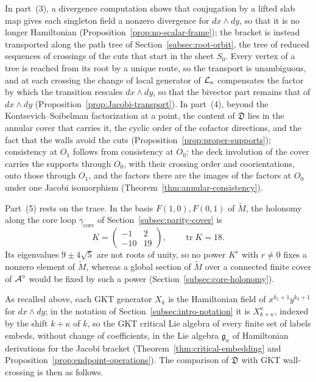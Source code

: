 In part~(3), a divergence computation shows that conjugation by a lifted
slab map gives each singleton field a nonzero divergence for $dx\wedge dy$,
so that it is no longer Hamiltonian
(Proposition~\ref{prop:no-scalar-frame}); the bracket is instead
transported along the path tree of Section~\ref{subsec:root-orbit}, the tree of reduced sequences of crossings
of the cuts that start in the sheet $S_0$.  Every vertex of a
tree is reached from its root by a unique route, so the transport is
unambiguous, and at each crossing the change of local generator of $\mathcal L_\kappa$
compensates the factor by which the transition rescales $dx\wedge dy$, so
that the bivector part remains that of $dx\wedge dy$
(Proposition~\ref{prop:Jacobi-transport}).  In part~(4), beyond the
Kontsevich--Soibelman factorization at a point, the content of $\mathfrak D$
lies in the annular cover that carries it, the cyclic order of the cofactor
directions, and the fact that the walls avoid the cuts
(Proposition~\ref{prop:proper-supports}); consistency at $O_1$ follows from consistency at $O_0$: the deck involution of the cover carries the supports through $O_0$, with their crossing order and coorientations, onto those through $O_1$, and the factors there are the images of the factors at $O_0$ under one Jacobi isomorphism (Theorem~\ref{thm:annular-consistency}).

Part~(5) rests on the trace.  In the basis $F(1,0),F(0,1)$ of
$\widetilde M$, the holonomy along the core loop $\gamma_{\mathrm{core}}$ of
Section~\ref{subsec:parity-cover} is
\begin{equation}\label{eq:intro-K}
 K=\begin{pmatrix}-1&2\\-10&19\end{pmatrix},
 \qquad \operatorname{tr}K=18.
\end{equation}
Its eigenvalues $9\pm4\sqrt5$ are not roots of unity, so no power $K^r$
with $r\neq0$ fixes a nonzero element of $\widetilde M$, whereas a global
section of $\widetilde M$ over a connected finite cover of $\mathcal A^\circ$
would be fixed by such a power (Section~\ref{subsec:core-holonomy}).

As recalled above, each GKT generator $X_k$ is the Hamiltonian field of
$x^{k_1+1}y^{k_2+1}$ for $dx\wedge dy$; in the notation of
Section~\ref{subsec:intro-notation} it is $X^\kappa_{k+\kappa}$, indexed by
the shift $k+\kappa$ of $k$, so the GKT critical Lie algebra of every finite set of labels embeds, without change
of coefficients, in the Lie algebra $\mathfrak g_\kappa$ of Hamiltonian
derivations for the Jacobi bracket (Theorem~\ref{thm:critical-embedding} and
Proposition~\ref{prop:endpoint-operations}).  The comparison of $\mathfrak D$
with GKT wall-crossing is then as follows.


